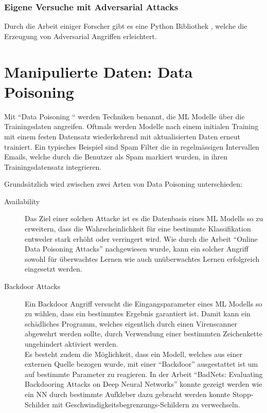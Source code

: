 \documentclass[
  12pt, %
  a4paper, %
  oneside, %
  openany, 
  numbers=noenddot, %
  BCOR=5mm, %
  parskip=half*, %
  thesis, %
]{bfhbook}
\begin{document}
\subsubsection*{Eigene Versuche mit Adversarial Attacks}
Durch die Arbeit einiger Forscher \parencite{papernot2018cleverhans} gibt es eine Python Bibliothek \parencite{cleverHans}, welche die Erzeugung von Adversarial Angriffen erleichtert.

\section{Manipulierte Daten: Data Poisoning}
\label{dataP}
Mit ``Data Poisoning `` werden Techniken benannt, die \Gls{ML} Modelle über die Trainingsdaten angreifen. Oftmals werden Modelle nach einem initialen Training mit einem festen Datensatz wiederkehrend mit aktualisierten Daten erneut trainiert. Ein typisches Beispiel sind Spam Filter die in regelmässigen Intervallen Emails, welche durch die Benutzer als Spam markiert wurden, in ihren Trainingsdatensatz integrieren.
 
Grundsätzlich wird zwischen zwei Arten von Data Poisoning unterschieden:
\begin{description}
  		\item[Availability] Das Ziel einer solchen Attacke ist es die Datenbasis eines \Gls{ML} Modells so zu erweitern, dass die Wahrscheinlichkeit für eine bestimmte Klassifikation entweder stark erhöht oder verringert wird. Wie durch die Arbeit ``Online Data Poisoning Attacks'' \parencite{Zhang2019} nachgewiesen wurde, kann ein solcher Angriff sowohl für überwachtes Lernen wie auch unüberwachtes Lernen erfolgreich eingesetzt werden. 
  		\item[Backdoor Attacks] Ein Backdoor Angriff versucht die Eingangsparameter eines \Gls{ML} Modells so zu wählen, dass ein bestimmtes Ergebnis garantiert ist. Damit kann ein schädliches Programm, welches eigentlich durch einen Virenscanner abgewehrt werden sollte, durch Verwendung einer bestimmten Zeichenkette ungehindert aktiviert werden.\\
  		Es besteht zudem die Möglichkeit, dass ein Modell, welches aus einer externen Quelle bezogen wurde, mit einer ``Backdoor'' ausgestattet ist um auf bestimmte Parameter zu reagieren. In der Arbeit ``BadNets: Evaluating Backdooring Attacks
on Deep Neural Networks'' \parencite{Gu2019} konnte gezeigt werden wie ein \gls{NN} durch bestimmte Aufkleber dazu gebracht werden konnte Stopp-Schilder mit Geschwindigkeitsbegrenzungs-Schildern zu verwechseln.
	\end{description}
\end{document}

